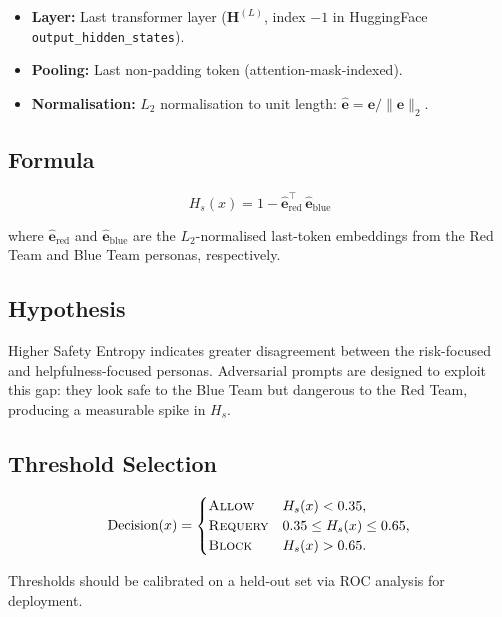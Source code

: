\documentclass[12pt,a4paper]{article}
\begin{document}
\begin{itemize}[nosep]
  \item \textbf{Layer:} Last transformer layer
        ($\mathbf{H}^{(L)}$, index $-1$ in HuggingFace
        \texttt{output\_hidden\_states}).
  \item \textbf{Pooling:} Last non-padding token (attention-mask-indexed).
  \item \textbf{Normalisation:} $L_2$ normalisation to unit length:
        $\hat{\mathbf{e}} = \mathbf{e} / \|\mathbf{e}\|_2$.
\end{itemize}

\subsection*{Formula}

\[
  H_s(x) = 1 - \hat{\mathbf{e}}_{\text{red}}^{\top}\,
             \hat{\mathbf{e}}_{\text{blue}}
\]

where $\hat{\mathbf{e}}_{\text{red}}$ and
$\hat{\mathbf{e}}_{\text{blue}}$ are the $L_2$-normalised last-token
embeddings from the Red Team and Blue Team personas, respectively.

\subsection*{Hypothesis}

Higher Safety Entropy indicates greater disagreement between the
risk-focused and helpfulness-focused personas.  Adversarial prompts are
designed to exploit this gap: they look safe to the Blue Team but
dangerous to the Red Team, producing a measurable spike in $H_s$.

\subsection*{Threshold Selection}

\[
  \text{Decision}(x) =
  \begin{cases}
    \textsc{Allow}   & H_s(x) < 0.35, \\
    \textsc{Requery}  & 0.35 \leq H_s(x) \leq 0.65, \\
    \textsc{Block}   & H_s(x) > 0.65.
  \end{cases}
\]

Thresholds should be calibrated on a held-out set via ROC analysis for
deployment.
\end{document}
